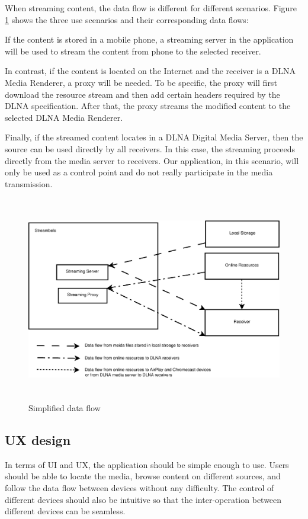 When streaming content, the data flow is different for different scenarios. Figure \ref{chart4} shows the three use scenarios and their corresponding data flows:

If the content is stored in a mobile phone, a streaming server in the application will be used to stream the content from phone to the selected receiver.

In contrast, if the content is located on the Internet and the receiver is a DLNA Media Renderer, a proxy will be needed. To be specific, the proxy will first download the resource stream and then add certain headers required by the DLNA specification. After that, the proxy streams the modified content to the selected DLNA Media Renderer.

Finally, if the streamed content locates in a DLNA Digital Media Server, then the source can be used directly by all receivers. In this case, the streaming proceeds directly from the media server to receivers. Our application, in this scenario, will only be used as a control point and do not really participate in the media transmission.

\begin{figure}[htb]
\centering \includegraphics[height=9cm]{charts/data_flow}
\caption{Simplified data flow \label{chart4}}
\end{figure}

\subsection{UX design\label{3_3}}
In terms of UI and UX, the application should be simple enough to use. Users should be able to locate the media, browse
 content on different sources, and follow the data flow between devices without any difficulty. The control of different devices should also be intuitive so that the inter-operation between different devices can be seamless.

